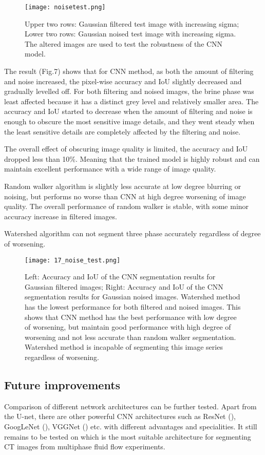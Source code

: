 \documentclass[draft,linenumbers]{agujournal2018}
\begin{document}
\begin{figure}[h]
 \centering
 \texttt{[image: noisetest.png]}
 \caption{Upper two rows: Gaussian filtered test image with increasing sigma; Lower two rows: Gaussian noised test image with increasing sigma. The altered images are used to test the robustness of the CNN model.}
 \label{fig5}
 \end{figure}
 
The result (Fig.7) shows that for CNN method, as both the amount of filtering and noise increased, the pixel-wise accuracy and IoU slightly decreased and gradually levelled off. For both filtering and noised images, the brine phase was least affected because it has a distinct grey level and relatively smaller area. The accuracy and IoU started to decrease when the amount of filtering and noise is enough to obscure the most sensitive image details, and they went steady when the least sensitive details are completely affected by the filtering and noise.

The overall effect of obscuring image quality is limited, the accuracy and IoU dropped less than 10\%. Meaning that the trained model is highly robust and can maintain excellent performance with a wide range of image quality.

Random walker algorithm is slightly less accurate at low degree blurring or noising, but performs no worse than CNN at high degree worsening of image quality. The overall performance of random walker is stable, with some minor accuracy increase in filtered images. 

Watershed algorithm can not segment three phase accurately regardless of degree of worsening.

\begin{figure}[h]
 \centering
 \texttt{[image: 17\_noise\_test.png]}
 \caption{Left: Accuracy and IoU of the CNN segmentation results for Gaussian filtered images; Right:  Accuracy and IoU of the CNN segmentation results for Gaussian noised images.  Watershed method has the lowest performance for both filtered and noised images. This shows that CNN method has the best performance with low degree of worsening, but maintain good performance with high degree of worsening and not less accurate than random walker segmentation. Watershed method is incapable of segmenting this image series regardless of worsening.}
 \label{fig6}
 \end{figure}

\subsection{Future improvements}
Comparison of different network architectures can be further tested. Apart from the U-net, there are other powerful CNN architectures such as ResNet (\citet{he2016deep}), GoogLeNet (\citet{szegedy2015going}), VGGNet (\citet{simonyan2014very}) etc. with different advantages and specialities. It still remains to be tested on which is the most suitable architecture for segmenting \textmu CT images from multiphase fluid flow experiments.
\end{document}
